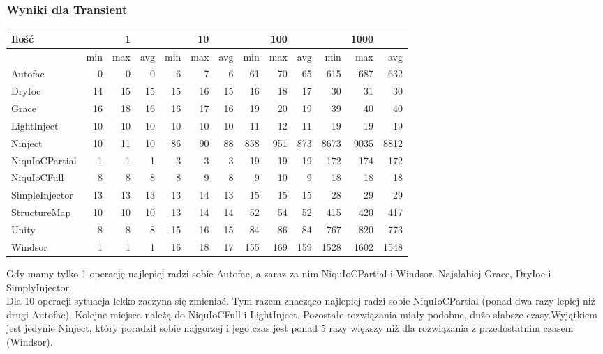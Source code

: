 \documentclass[12pt]{article}
\begin{document}
\subsubsection{Wyniki dla Transient}
\begin{center}
\begin{small}
	\begin{tabular}{ | l | r r r | r r r | r r r | r r r | }
    		\hline
     		Ilość & & 1 & & & 10 & & & 100 & & & 1000 & \\ \hline
     		 & min & max & avg & min & max & avg & min & max & avg & min & max & avg \\ \hline
    		Autofac & 0 & 0 & 0 & 6 & 7 & 6 & 61 & 70 & 65 & 615 & 687 & 632 \\ \hline
		DryIoc & 14 & 15 & 15 & 15 & 16 & 15 & 16 & 18 & 17 & 30 & 31 & 30 \\ \hline
		Grace & 16 & 18 & 16 & 16 & 17 & 16 & 19 & 20 & 19 & 39 & 40 & 40 \\ \hline
		LightInject & 10 & 10 & 10 & 10 & 10 & 10 & 11 & 12 & 11 & 19 & 19 & 19 \\ \hline
		Ninject & 10 & 11 & 10 & 86 & 90 & 88 & 858 & 951 & 873 & 8673 & 9035 & 8812 \\ \hline
		NiquIoCPartial & 1 & 1 & 1 & 3 & 3 & 3 & 19 & 19 & 19 & 172 & 174 & 172 \\ \hline
		NiquIoCFull & 8 & 8 & 8 & 8 & 9 & 8 & 9 & 10 & 9 & 18 & 18 & 18 \\ \hline
		SimpleInjector & 13 & 13 & 13 & 13 & 14 & 13 & 15 & 15 & 15 & 28 & 29 & 29 \\ \hline
		StructureMap & 10 & 10 & 10 & 13 & 14 & 14 & 52 & 54 & 52 & 415 & 420 & 417 \\ \hline
		Unity & 8 & 8 & 8 & 15 & 16 & 15 & 84 & 86 & 84 & 767 & 820 & 773 \\ \hline
		Windsor & 1 & 1 & 1 & 16 & 18 & 17 & 155 & 169 & 159 & 1528 & 1602 & 1548 \\
    		\hline
  	\end{tabular}
\end{small}
\end{center}
Gdy mamy tylko 1 operację najlepiej radzi sobie Autofac, a zaraz za nim NiquIoCPartial i Windsor. Najsłabiej Grace, DryIoc i SimplyInjector.\\
Dla 10 operacji sytuacja lekko zaczyna się zmieniać. Tym razem znacząco najlepiej radzi sobie NiquIoCPartial (ponad dwa razy lepiej niż drugi Autofac). Kolejne miejsca należą do NiquIoCFull i LightInject. Pozostałe rozwiązania miały podobne, dużo słabsze czasy.Wyjątkiem jest jedynie Ninject, który poradził sobie najgorzej i jego czas jest ponad 5 razy większy niż dla rozwiązania z przedostatnim czasem (Windsor).\\
\end{document}
